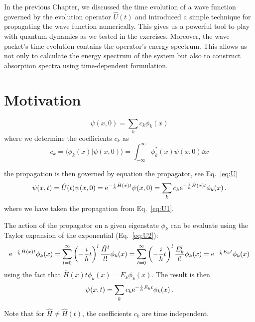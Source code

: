 In the previous Chapter, we discussed the time evolution of a wave function governed by the evolution operator $\hat{U}(t)$ and introduced a simple technique for propagating the wave function numerically. This gives us a powerful tool to play with quantum dynamics as we tested in the exercises. Moreover, the wave packet's time evolution contains the operator's energy spectrum. This allows us not only to calculate the energy spectrum of the system but also to construct absorption spectra using time-dependent formulation.

\section{Motivation}
\label{sec:autocorrintro}

\begin{equation}
    \psi(x,0) = \sum_k c_k \phi_k(x)
\end{equation}
where we determine the coefficients $c_k$ as 
\begin{equation}
    c_k = \langle \phi_k(x) | \psi(x,0) \rangle = \int_{-\infty}^\infty \phi_k^*(x) \psi(x,0) \dd x
\end{equation}

the propagation is then governed by equation the propagator, see Eq.~\eqref{eq:U}
\begin{equation}
    \psi(x,t) = \hat{U}(t)\psi(x,0) = \mathrm{e}^{-\frac{i}{\hbar}\hat{H}(x)t} \psi(x,0) = \sum_k c_k \mathrm{e}^{-\frac{i}{\hbar}\hat{H}(x)t} \phi_k(x) \, .
\end{equation}
where we have taken the propagation from Eq.~\eqref{eq:U1}.

The action of the propagator on a given eigenstate $\phi_k$ can be evaluate using the Taylor expansion of the exponential (Eq.~\eqref{eq:U2}):
\begin{equation}
    \mathrm{e}^{-\frac{i}{\hbar}\hat{H}(x)t} \phi_k(x) = \sum_{l=0}^\infty \left( -\frac{i}{\hbar} t\right)^l \frac{\hat{H}^l}{l!} \phi_k(x) = \sum_{l=0}^\infty \left( -\frac{i}{\hbar} t\right)^l \frac{E_k^l}{l!}  \phi_k(x) = \mathrm{e}^{-\frac{i}{\hbar}E_k t} \phi_k(x)
\end{equation}
using the fact that $\hat{H}(x)t \phi_k(x) = E_k \phi_k(x)$. The result is then
\begin{equation}
    \psi(x,t) = \sum_k c_k \mathrm{e}^{-\frac{i}{\hbar}E_k t}\phi_k(x) \, .
    \label{eq:tdpsi1}
\end{equation}

Note that for $\hat{H} \neq \hat{H}(t)$, the coefficients $c_k$ are time independent.

